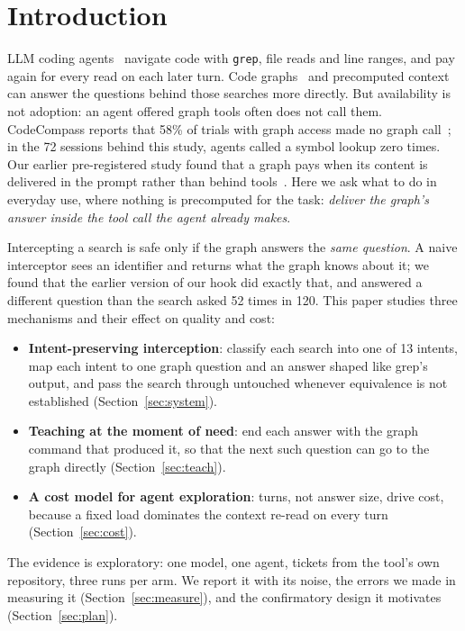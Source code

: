 \documentclass[conference]{IEEEtran}
\begin{document}
\section{Introduction}
LLM coding agents~\cite{jimenez2024swebench,yang2024sweagent} navigate code with \texttt{grep}, file reads and line
ranges, and pay again for every read on each later turn. Code graphs~\cite{liu2024codexgraph,ouyang2025repograph} and
precomputed context~\cite{le2026precomputed} can answer the questions behind those searches more directly. But
availability is not adoption: an agent offered graph tools often does not call them. CodeCompass reports that 58\% of
trials with graph access made no graph call~\cite{paipuru2026codecompass}; in the 72 sessions behind this study, agents
called a symbol lookup zero times. Our earlier pre-registered study found that a graph pays when its content is
delivered in the prompt rather than behind tools~\cite{le2026precomputed}. Here we ask what to do in everyday use, where
nothing is precomputed for the task: \emph{deliver the graph's answer inside the tool call the agent already makes}.

Intercepting a search is safe only if the graph answers the \emph{same question}. A naive interceptor sees an identifier
and returns what the graph knows about it; we found that the earlier version of our hook did exactly that, and answered
a different question than the search asked 52 times in 120. This paper studies three mechanisms and their effect on
quality and cost:
\begin{itemize}
\item \textbf{Intent-preserving interception}: classify each search into one of 13 intents, map each intent to one graph
  question and an answer shaped like grep's output, and pass the search through untouched whenever equivalence is not
  established (Section~\ref{sec:system}).
\item \textbf{Teaching at the moment of need}: end each answer with the graph command that produced it, so that the next
  such question can go to the graph directly (Section~\ref{sec:teach}).
\item \textbf{A cost model for agent exploration}: turns, not answer size, drive cost, because a fixed load dominates the
  context re-read on every turn (Section~\ref{sec:cost}).
\end{itemize}
The evidence is exploratory: one model, one agent, tickets from the tool's own repository, three runs per arm. We report
it with its noise, the errors we made in measuring it (Section~\ref{sec:measure}), and the confirmatory design it
motivates (Section~\ref{sec:plan}).
\end{document}
